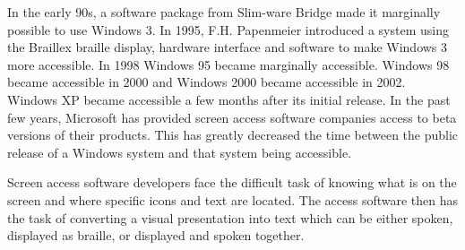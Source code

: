 \documentclass[11.5pt]{sig-alternate}
\begin{document}
\begin{large}
In the early 90s, a software package from Slim-ware Bridge made it marginally possible to use Windows 3. In 1995, F.H. Papenmeier introduced a system using the Braillex braille display, hardware interface and software to make Windows 3 more accessible. In 1998 Windows 95 became marginally accessible. Windows 98 became accessible in 2000 and Windows 2000 became accessible in 2002. Windows XP became accessible a few months after its initial release. In the past few years, Microsoft has provided screen access software companies access to beta versions of their products. This has greatly decreased the time between the public release of a Windows system and that system being accessible.

Screen access software developers face the difficult task of knowing what is on the screen and where specific icons and text are located. The access software then has the task of converting a visual presentation into text which can be either spoken, displayed as braille, or displayed and spoken together.


\end{large}
\end{document}
